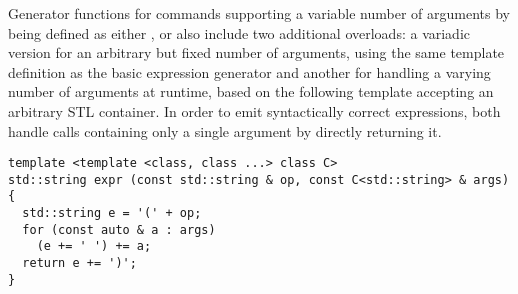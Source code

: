 \noindent
Generator functions for {\SMTLIB} commands supporting a variable number of arguments by being defined as either ,  or  %
also include two additional overloads:
a variadic version for an arbitrary but fixed number of arguments, using the same template definition as the basic expression generator 
and another for handling a varying number of arguments at runtime, based on the following template accepting an arbitrary STL container.
In order to emit syntactically correct {\SMTLIB} expressions, both handle calls containing only a single argument by directly returning it.



\newpage

\begin{lstlisting}[style=c++]
template <template <class, class ...> class C>
std::string expr (const std::string & op, const C<std::string> & args)
{
  std::string e = '(' + op;
  for (const auto & a : args)
    (e += ' ') += a;
  return e += ')';
}
\end{lstlisting}

